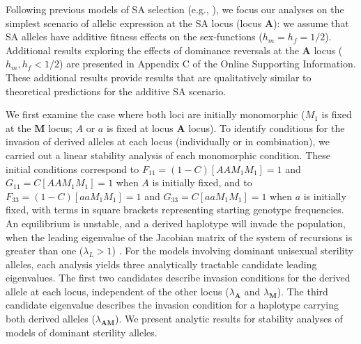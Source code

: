 \documentclass{article}
\begin{document}
Following previous models of SA selection (e.g., \citealp{Kidwell1977, Prout2000, JordanConnallon2014}), we focus our analyses on the simplest scenario of allelic expression at the SA locus (locus $\mathbf{A}$): we assume that SA alleles have additive fitness effects on the sex-functions ($h_m = h_f = 1/2$). Additional results exploring the effects of dominance reversals at the $\mathbf{A}$ locus ($h_m, h_f < 1/2$) are presented in Appendix C of the Online Supporting Information. These additional results provide results that are qualitatively similar to theoretical predictions for the additive SA scenario. 

We first examine the case where both loci are initially monomorphic ($M_1$ is fixed at the $\mathbf{M}$ locus; $A$ or $a$ is fixed at locus $\mathbf{A}$ locus). To identify conditions for the invasion of derived alleles at each locus (individually or in combination), we carried out a linear stability analysis of each monomorphic condition. These initial conditions correspond to $F_{11} = (1 - C) [AAM_1M_1] = 1$ and $G_{11} = C [AAM_1M_1] = 1$ when $A$ is initially fixed, and to $F_{33} = (1 - C) [aaM_1M_1] = 1$ and $G_{33} = C [aaM_1M_1] = 1$ when $a$ is initially fixed, with terms in square brackets representing starting genotype frequencies. An equilibrium is unstable, and a derived haplotype will invade the population, when the leading eigenvalue of the Jacobian matrix of the system of recursions is greater than one ($\lambda_L > 1$) \citep{OttoDay2007}. For the models involving dominant unisexual sterility alleles, each analysis yields three analytically tractable candidate leading eigenvalues. The first two candidates describe invasion conditions for the derived allele at each locus, independent of the other locus ($\lambda_\mathbf{A}$ and $\lambda_\mathbf{M}$). The third candidate eigenvalue describes the invasion condition for a haplotype carrying both derived alleles ($\lambda_\mathbf{AM}$). We present analytic results for stability analyses of models of dominant sterility alleles.
\end{document}
